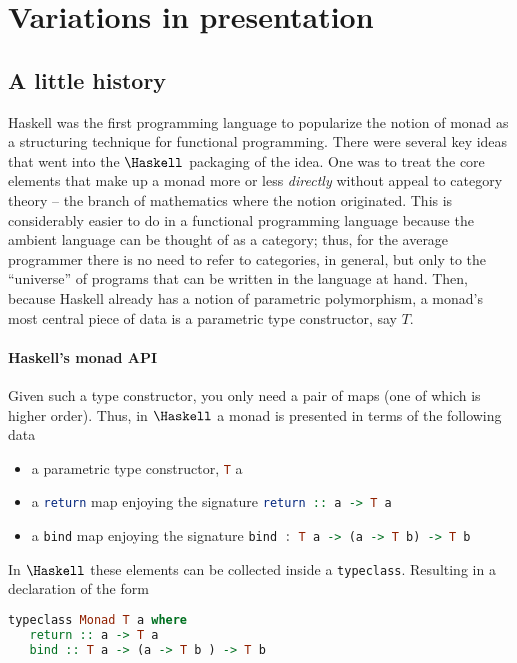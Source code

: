 \section{Variations in presentation}

\subsection{A little history}
Haskell was the first programming language to popularize the notion of
monad as a structuring technique for functional programming. There
were several key ideas that went into the $\Haskell$ packaging of the
idea. One was to treat the core elements that make up a monad more or
less \emph{directly} without appeal to category theory -- the branch
of mathematics where the notion originated. This is considerably
easier to do in a functional programming language because the ambient
language can be thought of as a category; thus, for the average
programmer there is no need to refer to categories, in general, but
only to the ``universe'' of programs that can be written in the
language at hand. Then, because Haskell already has a notion of
parametric polymorphism, a monad's most central piece of data is a
parametric type constructor, say $T$.

\paragraph{Haskell's monad API}
Given such a type constructor, you only need a pair of maps (one of
which is higher order). Thus, in $\Haskell$ a monad is presented in
terms of the following data

\begin{itemize}
  \item a parametric type constructor, \lstinline[language=Haskell]!T! a
  \item a \lstinline[language=Haskell]!return! map enjoying the
    signature \lstinline[language=Haskell]!return :: a -> T a!
  \item a \lstinline[language=Haskell]!bind! map enjoying the
    signature \lstinline[language=Haskell]!bind : T a -> (a -> T b) -> T b!
\end{itemize}

In $\Haskell$ these elements can be collected inside a
\lstinline[language=Haskell]!typeclass!. Resulting in a declaration of
the form

\begin{lstlisting}[captionpos=b,language=Haskell,caption=monad typeclass]
  typeclass Monad T a where
   return :: a -> T a
   bind :: T a -> (a -> T b ) -> T b
\end{lstlisting}

